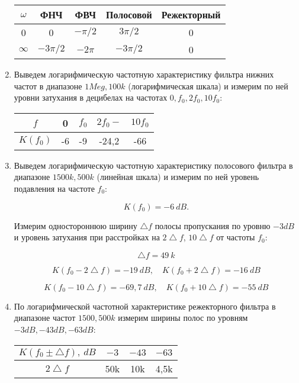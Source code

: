 \documentclass[a4paper, 12pt]{article}%
\begin{document}
\begin{enumerate}
\begin{center}
\begin{tabular}{|c|c|c|c|c|}
\hline 
$\omega$ & ФНЧ & ФВЧ & Полосовой & Режекторный \\ 
\hline 
0 & 0 & $-\pi/2$ & $3\pi/2$ & 0 \\ 
\hline 
$\infty$ & $-3\pi/2$ & $-2\pi$ & $-3\pi/2$ & 0 \\ 
\hline 
\end{tabular}
\end{center} 

\item Выведем логарифмическую частотную характеристику фильтра нижних частот в диапазоне $1Meg,100k$ (логарифмическая шкала) и измерим по ней уровни затухания в децибелах на частотах $0, f_0, 2f_0, 10f_0$:

\begin{center}
\begin{tabular}{|c|c|c|c|c|}
\hline 
$f$ & 0 & $f_0$ & $2f_0-$ & $10f_0$ \\ 
\hline 
$K(f_0)$ & -6 & -9 & -24,2 & -66 \\ 
\hline 
\end{tabular} 
\end{center}

\item Выведем логарифмическую частотную характеристику полосового фильтра в диапазоне $1500k,500k$ (линейная шкала) и измерим по ней уровень подавления на частоте $f_0$:

\[K(f_0) = -6 \: dB.\]

Измерим одностороннюю ширину $\bigtriangleup f$ полосы пропускания по уровню $-3 dB$ и уровень затухания при расстройках на $2\bigtriangleup f$, $10\bigtriangleup f$ от частоты $f_0$:

\[\bigtriangleup f = 49\: k\]

\[K(f_0 - 2\bigtriangleup f) = -19 \: dB, \quad K(f_0 + 2\bigtriangleup f) = -16 \: dB\]

\[K(f_0 - 10\bigtriangleup f) = -69,7 \: dB, \quad K(f_0 + 10\bigtriangleup f) = -55 \: dB\]

\item По логарифмической частотной характеристике режекторного фильтра в диапазоне частот $1500,500k$ измерим ширины полос по уровням $-3dB, -43dB, -63dB$:

\begin{center}
\begin{tabular}{|c|c|c|c|}
\hline 
$K(f_0 \pm \bigtriangleup f), \: dB$ & $-3$ & $-43$ & $-63$ \\ 
\hline 
$2\bigtriangleup f$ & 50k & 10k & 4,5k \\ 
\hline 
\end{tabular} 
\end{center}

\end{enumerate}
\end{document}
